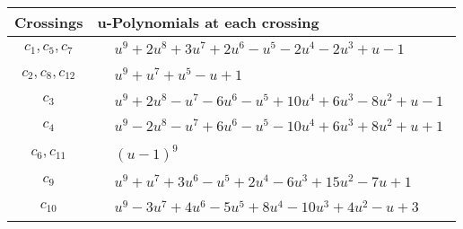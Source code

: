 \documentclass[1p]{elsarticle_modified}
\theoremstyle{definition}
\begin{document}
\begin{tabular}{m{50pt}|m{274pt}}
Crossings & \hspace{64pt}u-Polynomials at each crossing \\
\hline $$\begin{aligned}c_{1},c_{5},c_{7}\end{aligned}$$&$\begin{aligned}
&u^9+2 u^8+3 u^7+2 u^6- u^5-2 u^4-2 u^3+u-1
\end{aligned}$\\
\hline $$\begin{aligned}c_{2},c_{8},c_{12}\end{aligned}$$&$\begin{aligned}
&u^9+u^7+u^5- u+1
\end{aligned}$\\
\hline $$\begin{aligned}c_{3}\end{aligned}$$&$\begin{aligned}
&u^9+2 u^8- u^7-6 u^6- u^5+10 u^4+6 u^3-8 u^2+u-1
\end{aligned}$\\
\hline $$\begin{aligned}c_{4}\end{aligned}$$&$\begin{aligned}
&u^9-2 u^8- u^7+6 u^6- u^5-10 u^4+6 u^3+8 u^2+u+1
\end{aligned}$\\
\hline $$\begin{aligned}c_{6},c_{11}\end{aligned}$$&$\begin{aligned}
&(u-1)^9
\end{aligned}$\\
\hline $$\begin{aligned}c_{9}\end{aligned}$$&$\begin{aligned}
&u^9+u^7+3 u^6- u^5+2 u^4-6 u^3+15 u^2-7 u+1
\end{aligned}$\\
\hline $$\begin{aligned}c_{10}\end{aligned}$$&$\begin{aligned}
&u^9-3 u^7+4 u^6-5 u^5+8 u^4-10 u^3+4 u^2- u+3
\end{aligned}$\\
\hline
\end{tabular}\\~\\
\end{document}
